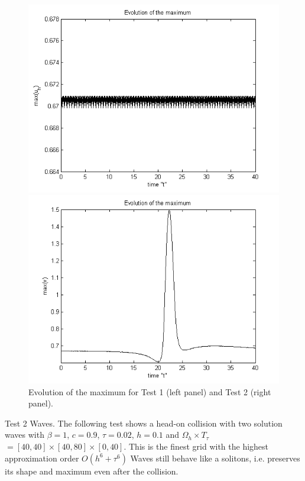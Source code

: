 \documentclass[11pt,a4paper,twoside]{article}
\begin{document}
\begin{figure}[!htbp]
	\centering
	\begin{minipage}[b]{0.4\linewidth}
		\includegraphics[width=\linewidth]{Pictures/EvolutionOfMaximum.png}
	\end{minipage}	
	\begin{minipage}[b]{0.4\linewidth}
		 \includegraphics[width=\linewidth]{Pictures/EvolutionOfMaximumTwoWaves.png}
	\end{minipage}

	\caption{Evolution of the maximum for Test 1 (left panel) and Test 2 (right panel).}
	\label{fig:solMax40}
\end{figure}


Test 2 Waves. The following test shows a head-on collision with two solution waves with $\beta = 1$, $c = 0.9$, $\tau = 0.02$, $h = 0.1$ and $\Omega_h \times T_{\tau}$ $= [40, 40] \times [40, 80] \times [0, 40]$. This is the finest grid with the highest approximation order $O(h^6 + \tau^6)$ Waves still behave like a solitons, i.e. preserves its shape and maximum even after the collision.
\end{document}
